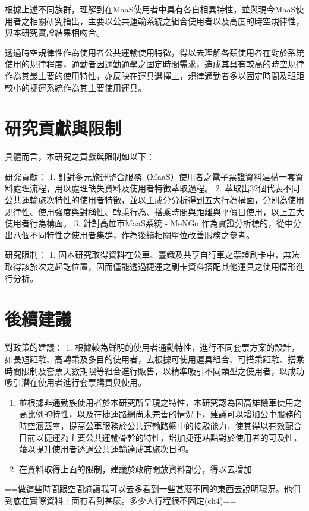 根據上述不同族群，理解到在MaaS使用者中具有各自相異特性，並與現今MaaS使用者之相關研究指出，主要以公共運輸系統之組合使用者以及高度的時空規律性，與本研究實證結果相吻合。

透過時空規律性作為使用者公共運輸使用特徵，得以去理解各類使用者在對於系統使用的規律程度，通勤者因通勤通學之固定時間需求，造成其具有較高的時空規律作為其最主要的使用特性，亦反映在運具選擇上，規律通勤者多以固定時間及班距較小的捷運系統作為其主要使用運具。

\section{研究貢獻與限制}\label{ux7814ux7a76ux8ca2ux737bux8207ux9650ux5236}

具體而言，本研究之貢獻與限制如以下：

研究貢獻： 1.
針對多元旅運整合服務（MaaS）使用者之電子票證資料建構一套資料處理流程，用以處理缺失資料及使用者特徵萃取過程。
2.
萃取出32個代表不同公共運輸旅次特性的使用者特徵，並以主成分分析得到五大行為構面，分別為使用規律性、使用強度與對稱性、轉乘行為、搭乘時間與距離與平假日使用，以上五大使用者行為構面。
3. 針對高雄市MaaS系統 - MeNGo
作為實證分析標的，從中分出八個不同特性之使用者集群，作為後續相關單位改善服務之參考。

研究限制： 1.
因本研究取得資料在公車、臺鐵及共享自行車之票證刷卡中，無法取得該旅次之起訖位置，因而僅能透過捷運之刷卡資料搭配其他運具之使用情形進行分析。

\section{後續建議}\label{ux5f8cux7e8cux5efaux8b70}

對政策的建議： 1.
根據較為鮮明的使用者通勤特性，進行不同套票方案的設計，如長短距離、高轉乘及多目的使用者，去根據可使用運具組合、可搭乘距離、搭乘時間限制及套票天數期限等組合進行販售，以精準吸引不同類型之使用者，以成功吸引潛在使用者進行套票購買與使用。

\begin{enumerate}
\def\labelenumi{\arabic{enumi}.}
\setcounter{enumi}{1}
\item
  並根據非通勤族使用者於本研究所呈現之特性，本研究認為因高雄機車使用之高比例的特性，以及在捷運路網尚未完善的情況下，建議可以增加公車服務的時空涵蓋率，提高公車服務於公共運輸路網中的接駁能力，使其得以有效配合目前以捷運為主要公共運輸骨幹的特性，增加捷運站點對於使用者的可及性，藉以提升使用者透過公共運輸達成其旅次目的。
\item
  在資料取得上面的限制，建議於政府開放資料部分，得以去增加
\end{enumerate}

==做這些時間跟空間熵讓我可以去多看到一些甚麼不同的東西去說明現況。他們到底在實際資料上面有看到甚麼。多少人行程很不固定(ch4)==
